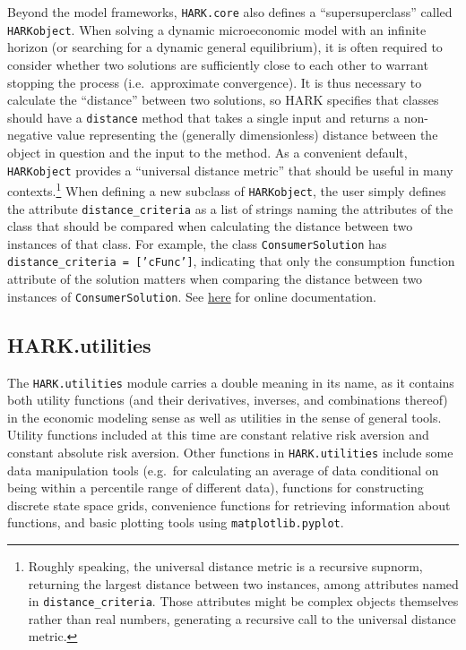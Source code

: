 \documentclass[12pt,titlepage,letterpaper]{econtex}
\begin{document}
{Beyond the model frameworks, \texttt{HARK.core} also defines a ``supersuperclass'' called \texttt{HARKobject}.  When solving a dynamic microeconomic model with an infinite horizon (or searching for a dynamic general equilibrium), it is often required to consider whether two solutions are sufficiently close to each other to warrant stopping the process (i.e.\ approximate convergence).  It is thus necessary to calculate the ``distance'' between two solutions, so HARK specifies that classes should have a \texttt{distance} method that takes a single input and returns a non-negative value representing the (generally dimensionless) distance between the object in question and the input to the method.  As a convenient default, \texttt{HARKobject} provides a ``universal distance metric'' that should be useful in many contexts.\footnote{Roughly speaking, the universal distance metric is a recursive supnorm, returning the largest distance between two instances, among attributes named in \texttt{distance\_criteria}.  Those attributes might be complex objects themselves rather than real numbers, generating a recursive call to the universal distance metric.}  When defining a new subclass of \texttt{HARKobject}, the user simply defines the attribute \texttt{distance\_criteria} as a list of strings naming the attributes of the class that should be compared when calculating the distance between two instances of that class.  For example, the class \texttt{ConsumerSolution} has \texttt{distance\_criteria = ['cFunc']}, indicating that only the consumption function attribute of the solution matters when comparing the distance between two instances of \texttt{ConsumerSolution}.  See \href{https://econ-ark.github.io/HARK/generated/HARK.core.html}{here} for online documentation.

\subsection{HARK.utilities}\label{sec:HARKutilities}

The \texttt{HARK.utilities} module carries a double meaning in its name, as it contains both utility functions (and their derivatives, inverses, and combinations thereof) in the economic modeling sense as well as utilities in the sense of general tools.  Utility functions included at this time are constant relative risk aversion and constant absolute risk aversion.  Other functions in \texttt{HARK.utilities} include some data manipulation tools (e.g.\ for calculating an average of data conditional on being within a percentile range of different data), functions for constructing discrete state space grids, convenience functions for retrieving information about functions, and basic plotting tools using \texttt{matplotlib.pyplot}.

}
\end{document}
